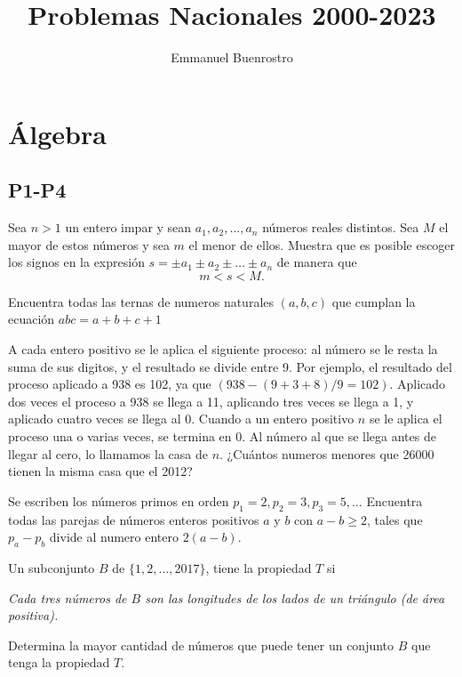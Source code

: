 \documentclass[11pt]{scrartcl}
\begin{document}
\title{Problemas Nacionales 2000-2023}
\author{Emmanuel Buenrostro}

\maketitle

\section{Álgebra}

\subsection{P1-P4}
\begin{problem} [2009/4]

    Sea $n > 1$ un entero impar y sean $a_1,a_2,\dots, a_n$ números reales distintos. Sea $M$ el mayor de estos números y sea $m$ el menor de ellos. Muestra que es posible escoger los signos en la expresión $s=\pm a_1\pm a_2\pm \dots \pm a_n$ de manera que \[m< s < M.\]
    
\end{problem}
\begin{problem}
[2010/1] Encuentra todas las ternas de numeros naturales $(a,b,c)$ que cumplan la ecuación $abc=a+b+c+1$
\end{problem}

\begin{problem}
[2012/4] A cada entero positivo se le aplica el siguiente proceso: al número se le resta la suma de sus digitos, y el resultado se divide entre 9. Por ejemplo, el resultado del proceso aplicado a 938 es 102, ya que $(938-(9+3+8)/9=102)$. Aplicado dos veces el proceso a 938 se llega a 11, aplicando tres veces se llega a 1, y aplicado cuatro veces se llega al 0. Cuando a un entero positivo $n$ se le aplica el proceso una o varias veces, se termina en 0. Al número al que se llega antes de llegar al cero, lo llamamos la casa de $n$. ¿Cuántos numeros menores que 26000 tienen la misma casa que el 2012?
\end{problem}

\begin{problem}
[2013/1] Se escriben los números primos en orden $p_1=2, p_2=3, p_3=5,\ldots$ Encuentra todas las parejas de números enteros positivos $a$ y $b$ con $a-b\geq 2$, tales que $p_a-p_b$ divide al numero entero $2(a-b)$.
\end{problem}

\begin{problem}
[2017/4] Un subconjunto $B$ de $\{ 1,2,\ldots ,2017\}$, tiene la propiedad $T$ si 
\begin{center}
\textit{Cada tres números de $B$ son las longitudes de los lados de un triángulo (de área positiva).}
\end{center}
Determina la mayor cantidad de números que puede tener un conjunto $B$ que tenga la propiedad $T$.
\end{problem}
\end{document}
